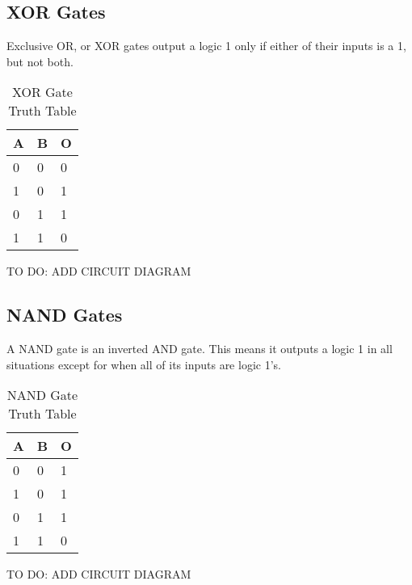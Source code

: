 \subsection{XOR Gates}
Exclusive OR, or XOR gates output a logic 1 only if either of their inputs is a 1, but not both.
\begin{table}[H]
\centering
\begin{tabular}{l|l|l}
\hline
\multicolumn{1}{|l|}{\textbf{A}} & \textbf{B} & \multicolumn{1}{l|}{\textbf{O}} \\ \hline
0                                & 0          & 0                               \\
1                                & 0          & 1                               \\
0                                & 1          & 1                               \\
1                                & 1          & 0
\end{tabular}
\caption{XOR Gate Truth Table}
\label{tab:xor-table}
\end{table}
TO DO: ADD CIRCUIT DIAGRAM

\subsection{NAND Gates}
A NAND gate is an inverted AND gate. This means it outputs a logic 1 in all situations except for when all of its inputs are logic 1's.
\begin{table}[H]
\centering
\begin{tabular}{l|l|l}
\hline
\multicolumn{1}{|l|}{\textbf{A}} & \textbf{B} & \multicolumn{1}{l|}{\textbf{O}} \\ \hline
0                                & 0          & 1                               \\
1                                & 0          & 1                               \\
0                                & 1          & 1                               \\
1                                & 1          & 0
\end{tabular}
\caption{NAND Gate Truth Table}
\label{tab:nand-table}
\end{table}
TO DO: ADD CIRCUIT DIAGRAM


